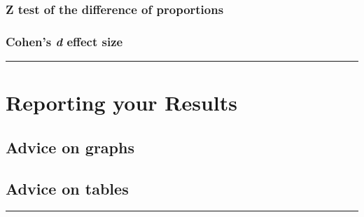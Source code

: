 \documentclass[
]{report}
\begin{document}
\hypertarget{z-test-of-the-difference-of-proportions}{%
\subsection{Z test of the difference of
proportions}\label{z-test-of-the-difference-of-proportions}}

\hypertarget{cohens-d-effect-size}{%
\subsection{\texorpdfstring{Cohen's \emph{d} effect
size}{Cohen's d effect size}}\label{cohens-d-effect-size}}

\begin{center}\rule{0.5\linewidth}{0.5pt}\end{center}

\hypertarget{reporting-your-results}{%
\chapter{Reporting your Results}\label{reporting-your-results}}

\hypertarget{advice-on-graphs}{%
\section{Advice on graphs}\label{advice-on-graphs}}

\hypertarget{advice-on-tables}{%
\section{Advice on tables}\label{advice-on-tables}}

\begin{center}\rule{0.5\linewidth}{0.5pt}\end{center}

  
\end{document}
